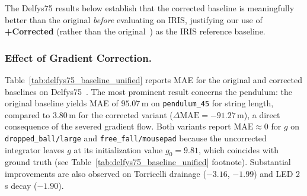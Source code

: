 \documentclass[runningheads]{llncs}
\begin{document}
The Delfys75 results below establish that the corrected baseline is meaningfully better than the original \emph{before} evaluating on IRIS, justifying our use of \textbf{+Corrected} (rather than the original~\cite{garcia2025learning}) as the IRIS reference baseline.

\subsubsection{Effect of Gradient Correction.}

Table~\ref{tab:delfys75_baseline_unified} reports MAE for the original and corrected baselines on Delfys75~\cite{garcia2025learning}. The most prominent result concerns the pendulum: the original baseline yields MAE of $95.07$\,m on \texttt{pendulum\_45} for string length, compared to $3.80$\,m for the corrected variant ($\Delta\mathrm{MAE} = -91.27$\,m), a direct consequence of the severed gradient flow. Both variants report $\mathrm{MAE} \approx 0$ for $g$ on \texttt{dropped\_ball/large} and \texttt{free\_fall/mousepad} because the uncorrected integrator leaves $g$ at its initialization value $g_0 = 9.81$, which coincides with ground truth (see Table~\ref{tab:delfys75_baseline_unified} footnote). Substantial improvements are also observed on Torricelli drainage ($-3.16$, $-1.99$) and LED 2\,s decay ($-1.90$).
\end{document}
